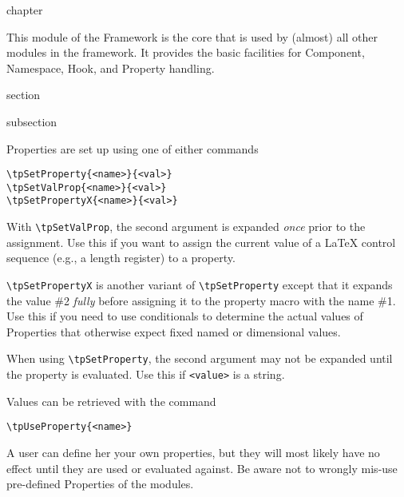 \begin{heading}[label=chap:common]{chapter}
\end{heading}

This module of the {\CoCoTeX} Framework is the core
that is used by (almost) all other modules in the framework. It
provides the basic facilities for Component, Namespace, Hook, and
Property handling.

\begin{heading}[label=sec:use_props]{section}
\end{heading}

\begin{heading}[label=sec:set_props]{subsection}
\end{heading}

Properties are set up using one of either commands
\begin{lstlisting}[style=tex]
\tpSetProperty{<name>}{<val>}
\tpSetValProp{<name>}{<val>}
\tpSetPropertyX{<name>}{<val>}
\end{lstlisting}
With
\lstinline{\tpSetValProp}, the second argument is expanded \textit{once}
prior to the assignment. Use this if you want to assign the current
value of a {\LaTeX} control sequence (e.g., a length register) to a
property.

\lstinline{\tpSetPropertyX} is another variant of \lstinline{\tpSetProperty}
except that it expands the value \#2 \textit{fully} before assigning
it to the property macro with the name \#1.  Use this if you need to
use conditionals to determine the actual values of Properties that
otherwise expect fixed named or dimensional values.


When using \lstinline{\tpSetProperty}, the second argument may not be
expanded until the property is evaluated. Use this if
\lstinline{<value>} is a string.

Values can be retrieved with the command
\begin{lstlisting}[style=tex]
\tpUseProperty{<name>}
\end{lstlisting}

A user can define her your own properties, but they will most likely
have no effect until they are used or evaluated against. Be aware not
to wrongly mis-use pre-defined Properties of the {\CoCoTeX}
modules.


